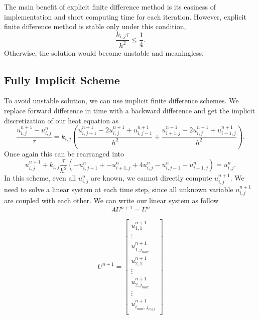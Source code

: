 \documentclass[10pt,a4paper]{report}
\begin{document}
The main benefit of explicit finite difference method is its easiness of implementation and short computing time for each iteration. However, explicit finite difference method is stable only under this condition,
\begin{equation}
{\frac{k_{i,j}\tau}{h^2}}\leq {\frac{1}{4}}.
\end{equation}
\[\] Otherwise, the solution would become unstable and meaningless.\\


\subsection{Fully Implicit Scheme}

To avoid unstable solution, we can use implicit finite difference schemes. We replace forward difference in time with a backward difference and get the implicit discretization of our heat equation as
\begin{equation}
{\frac{u^{n+1}_{i,j}-u^n_{i,j}}{\tau}}=k_{i,j}({\frac{u^{n+1}_{i,j+1}-2u^{n+1}_{i,j}+u^{n+1}_{i,j-1}}{h^2}}+{\frac{u^{n+1}_{i+1,j}-2u^{n+1}_{i,j}+u^{n+1}_{i-1,j}}{h^2}}).
\end{equation}
 \[\]
Once again this can be rearranged into
\begin{equation}
u^{n+1}_{i,j}+k_{i,j}{\frac{\tau}{h^2}}(-u^n_{i,j+1}+-u^n_{i+1,j}+4u^n_{i,j}-u^n_{i,j-1}-u^n_{i-1,j})=u^{n}_{i,j}.
\end{equation}
\[\]
In this scheme, even all $u^n_{i,j}$ are known, we cannot directly compute $u^{n+1}_{i,j} $. We need to solve a linear system at each time step, since all unknown variable $u^{n+1}_{i,j}$ are coupled with each other. We can write our linear system as follow \[\] 
\begin{equation}
AU^{n+1}=U^{n}
\end{equation}

\begin{equation}
U^{n+1}=\begin{bmatrix}
u^{n+1}_{1,1}\\
\vdots\\
u^{n+1}_{1,j_{max}}\\
u^{n+1}_{2,1}\\
\vdots\\
u^{n+1}_{2,j_{max}}\\
\vdots\\
u^{n+1}_{i_{max},j_{max}}\\
\end{bmatrix}
\end{equation}
\[
\]
\end{document}
